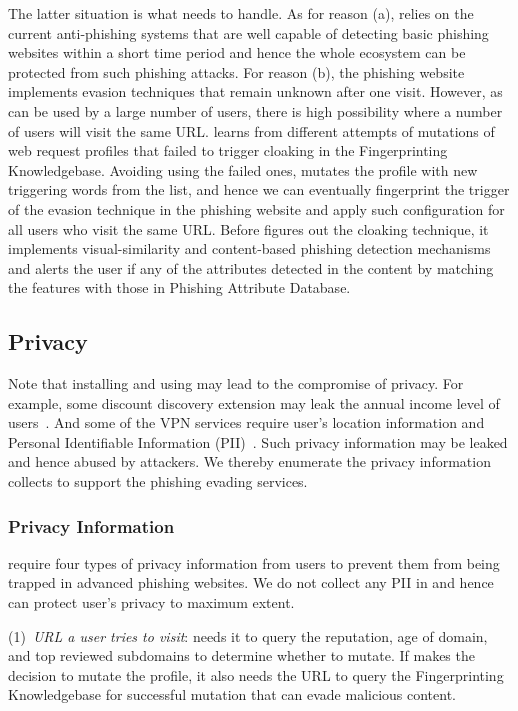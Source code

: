 The latter situation is what \spartacus needs to handle.
As for reason (a), \spartacus relies on the current anti-phishing systems that are well capable of detecting basic phishing websites within a short time period and hence the whole ecosystem can be protected from such phishing attacks.
For reason (b), the phishing website implements evasion techniques that remain unknown after one visit.
However, as \spartacus can be used by a large number of users, there is high possibility where a number of users will visit the same URL.
\spartacus learns from different attempts of mutations of web request profiles that failed to trigger cloaking in the Fingerprinting Knowledgebase.
Avoiding using the failed ones, \spartacus mutates the profile with new triggering words from the list, and hence we can eventually fingerprint the trigger of the evasion technique in the phishing website and apply such configuration for all \spartacus users who visit the same URL.
Before \spartacus figures out the cloaking technique, it implements visual-similarity and content-based phishing detection mechanisms and alerts the user if any of the attributes detected in the content by matching the features with those in Phishing Attribute Database.

\subsection{Privacy}

Note that installing and using \spartacus may lead to the compromise of privacy.
For example, some discount discovery extension may leak the annual income level of users~\cite{honey}.
And some of the VPN services require user's location information and Personal Identifiable Information (PII)~\cite{ZenMate}.
Such privacy information may be leaked and hence abused by attackers.  
We thereby enumerate the privacy information \spartacus collects to support the phishing evading services.

\subsubsection{Privacy Information}

\spartacus require four types of privacy information from users to prevent them from being trapped in advanced phishing websites.
We do not collect any PII in \spartacus and hence can protect user's privacy to maximum extent.

(1)~\emph{URL a user tries to visit}: \spartacus needs it to query the reputation, age of domain, and top reviewed subdomains to determine whether to mutate.
If \spartacus makes the decision to mutate the profile, it also needs the URL to query the Fingerprinting Knowledgebase for successful mutation that can evade malicious content.

